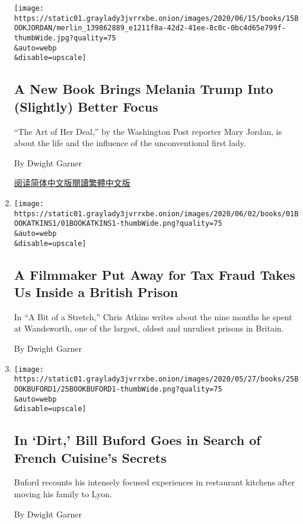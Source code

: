 \begin{enumerate}
  \texttt{[image: https://static01.graylady3jvrrxbe.onion/images/2020/06/15/books/15BOOKJORDAN/merlin\_139862889\_e1211f8a-42d2-41ee-8c0c-0bc4d65e799f-thumbWide.jpg?quality=75\\\&auto=webp\\\&disable=upscale]}

  \hypertarget{a-new-book-brings-melania-trump-into-slightly-better-focus}{%
  \subsection{A New Book Brings Melania Trump Into (Slightly) Better
  Focus}\label{a-new-book-brings-melania-trump-into-slightly-better-focus}}

  ``The Art of Her Deal,'' by the Washington Post reporter Mary Jordan,
  is about the life and the influence of the unconventional first lady.

  By Dwight Garner

  \href{https://cn.nytimes3xbfgragh.onion/usa/20200617/review-art-of-her-deal-melania-trump-mary-jordan/}{阅读简体中文版}\href{https://cn.nytimes3xbfgragh.onion/usa/20200617/review-art-of-her-deal-melania-trump-mary-jordan/zh-hant/}{閱讀繁體中文版}
\item
  \href{/2020/06/01/books/review-bit-of-stretch-prisoner-diaries-chris-atkins.html}{}

  \texttt{[image: https://static01.graylady3jvrrxbe.onion/images/2020/06/02/books/01BOOKATKINS1/01BOOKATKINS1-thumbWide.png?quality=75\\\&auto=webp\\\&disable=upscale]}

  \hypertarget{a-filmmaker-put-away-for-tax-fraud-takes-us-inside-a-british-prison}{%
  \subsection{A Filmmaker Put Away for Tax Fraud Takes Us Inside a
  British
  Prison}\label{a-filmmaker-put-away-for-tax-fraud-takes-us-inside-a-british-prison}}

  In ``A Bit of a Stretch,'' Chris Atkins writes about the nine months
  he spent at Wandsworth, one of the largest, oldest and unruliest
  prisons in Britain.

  By Dwight Garner
\item
  \href{/2020/05/25/books/review-dirt-bill-buford.html}{}

  \texttt{[image: https://static01.graylady3jvrrxbe.onion/images/2020/05/27/books/25BOOKBUFORD1/25BOOKBUFORD1-thumbWide.png?quality=75\\\&auto=webp\\\&disable=upscale]}

  \hypertarget{in-dirt-bill-buford-goes-in-search-of-french-cuisines-secrets}{%
  \subsection{In `Dirt,' Bill Buford Goes in Search of French Cuisine's
  Secrets}\label{in-dirt-bill-buford-goes-in-search-of-french-cuisines-secrets}}

  Buford recounts his intensely focused experiences in restaurant
  kitchens after moving his family to Lyon.

  By Dwight Garner
\end{enumerate}

